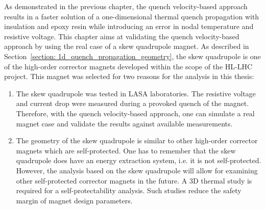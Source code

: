 As demonstrated in the previous chapter, the quench velocity-based approach results in a faster solution of a one-dimensional thermal quench propagation with insulation and epoxy resin while introducing an error in nodal temperature and resistive voltage. This chapter aims at validating the quench velocity-based approach by using the real case of a skew quadrupole magnet.
As described in Section~\ref{section: 1d_quench_propagation_geometry}, the skew quadrupole is one of the high-order corrector magnets developed within the scope of the HL-LHC project. This magnet was selected for two reasons for the analysis in this thesis: 
\begin{enumerate}
    \item The skew quadrupole was tested in LASA laboratories. The resistive voltage and current drop were measured during a provoked quench of the magnet. Therefore, with the quench velocity-based approach, one can simulate a real magnet case and validate the results against available measurements. 
    \item The geometry of the skew quadrupole is similar to other high-order corrector magnets which are self-protected. One has to remember that the skew quadrupole does have an energy extraction system, i.e. it is not self-protected. However, the analysis based on the skew quadrupole will allow for examining other self-protected corrector magnets in the future. A 3D thermal study is required for a self-protectability analysis. Such studies reduce the safety margin of magnet design parameters. 
\end{enumerate}
